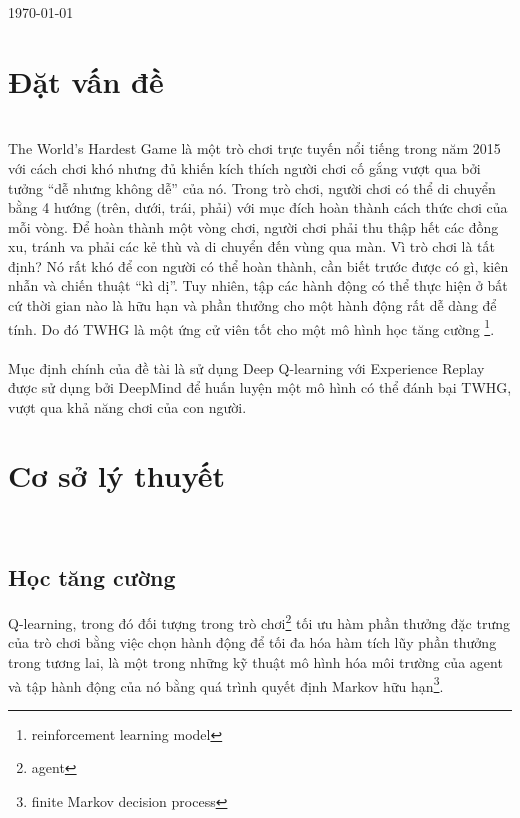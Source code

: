 \documentclass[12pt,a4paper]{article}
\begin{document}
\begin{titlepage}
	\vfill\vfill\vfill %
	
	{\large\today} %
	
	
	 
	
	\vfill %
	
\end{titlepage}
\clearpage
\tableofcontents
\clearpage
\noindent \section{Đặt vấn đề}\\
The World’s Hardest Game là một trò chơi trực tuyến nổi tiếng trong năm 2015 với cách chơi khó nhưng đủ khiến kích thích người chơi cố gắng vượt qua bởi tưởng “dễ nhưng không dễ” của nó. Trong trò chơi, người chơi có thể di chuyển bằng 4 hướng (trên, dưới, trái, phải) với mục đích hoàn thành cách thức chơi của mỗi vòng. Để hoàn thành một vòng chơi, người chơi phải thu thập hết các đồng xu, tránh va phải các kẻ thù và di chuyển đến vùng qua màn. Vì trò chơi là tất định? Nó rất khó để con người có thể hoàn thành, cần biết trước được có gì, kiên nhẫn và chiến thuật “kì dị”. Tuy nhiên, tập các hành động có thể thực hiện ở bất cứ thời gian nào là hữu hạn và phần thưởng cho một hành động rất dễ dàng để tính. Do đó TWHG là một ứng cử viên tốt cho một mô hình học tăng cường \footnote{reinforcement learning model}.\\
\\
Mục định chính của đề tài là sử dụng Deep Q-learning với Experience Replay được sử dụng bởi DeepMind để huấn luyện một mô hình có thể đánh bại TWHG, vượt qua khả năng chơi của con người.
\clearpage
\section{Cơ sở lý thuyết}\\
\subsection{Học tăng cường}
Q-learning, trong đó đối tượng trong trò chơi\footnote{agent} tối ưu hàm phần thưởng đặc trưng của trò chơi bằng việc chọn hành động để tối đa hóa hàm tích lũy phần thưởng trong tương lai, là một trong những kỹ thuật mô hình hóa môi trường của agent và tập hành động của nó bằng quá trình quyết định Markov hữu hạn\footnote{finite Markov decision process}.\\
\end{document}
